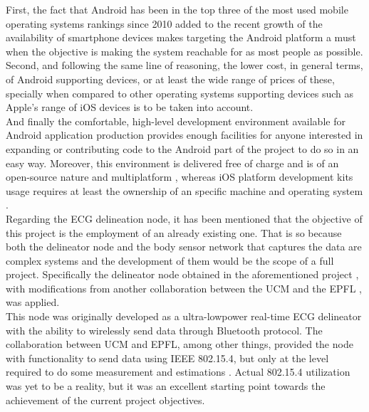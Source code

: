 		First, the fact that Android has been in the top three of the most used mobile operating systems rankings since 2010 \cite{androidSpread} added to the recent growth of the availability of smartphone devices \cite{sphoneStudy} makes targeting the Android platform a must when the objective is making the system reachable for as most people as possible.\\

		Second, and following the same line of reasoning, the lower cost, in general terms, of Android supporting devices, or at least the wide range of prices of these, specially when compared to other operating systems supporting devices such as Apple's range of iOS devices is to be taken into account.\\

		And finally the comfortable, high-level development environment available for Android application production \cite{andDev-what} provides enough facilities for anyone interested in expanding or contributing code to the Android part of the project to do so in an easy way. Moreover, this environment is delivered free of charge and is of an open-source nature and multiplatform \cite{andDev-sdk}, whereas iOS platform development kits usage requires at least the ownership of an specific machine and operating system \cite{iosDev}.\\

		Regarding the ECG delineation node, it has been mentioned that the objective of this project is the employment of an already existing one. That is so because both the delineator node and the body sensor network that captures the data are complex systems and the development of them would be the scope of a full project. Specifically the delineator node obtained in the aforementioned project \cite{ESL}, with modifications from another collaboration between the UCM and the EPFL \cite{ecg.del.paper}, was applied.\\

		This node was originally developed as a ultra-lowpower real-time ECG delineator with the ability to wirelessly send data through Bluetooth protocol. The collaboration between UCM and EPFL, among other things, provided the node with functionality to send data using IEEE 802.15.4, but only at the level required to do some measurement and estimations \cite{ecg.del.paper}. Actual 802.15.4 utilization was yet to be a reality, but it was an excellent starting point towards the achievement of the current project objectives.\\

